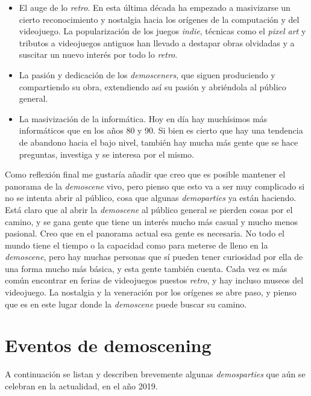 \begin{itemize}
	\item El auge de lo \emph{retro}. En esta última década ha empezado a masivizarse un cierto reconocimiento y nostalgia hacia los orígenes de la computación y del videojuego. La popularización de los juegos \emph{indie}, técnicas como el \emph{pixel art} y tributos a videojuegos antiguos han llevado a destapar obras olvidadas y a suscitar un nuevo interés por todo lo \emph{retro}.
	\item La pasión y dedicación de los \emph{demosceners}, que siguen produciendo y compartiendo su obra, extendiendo así su pasión y abriéndola al público general.
	\item La masivización de la informática. Hoy en día hay muchísimos más informáticos que en los años 80 y 90. Si bien es cierto que hay una tendencia de abandono hacia el bajo nivel, también hay mucha más gente que se hace preguntas, investiga y se interesa por el mismo.
\end{itemize}

Como reflexión final me gustaría añadir que creo que es posible mantener el panorama de la \emph{demoscene} vivo, pero pienso que esto va a ser muy complicado si no se intenta abrir al público, cosa que algunas \emph{demoparties} ya están haciendo. Está claro que al abrir la \emph{demoscene} al público general se pierden cosas por el camino, y se gana gente que tiene un interés mucho más casual y mucho menos pasional. Creo que en el panorama actual esa gente es necesaria. No todo el mundo tiene el tiempo o la capacidad como para meterse de lleno en la \emph{demoscene}, pero hay muchas personas que sí pueden tener curiosidad por ella de una forma mucho más básica, y esta gente también cuenta. Cada vez es más común encontrar en ferias de videojuegos puestos \emph{retro}, y hay incluso museos del videojuego. La nostalgia y la veneración por los orígenes se abre paso, y pienso que es en este lugar donde la \emph{demoscene} puede buscar su camino.

\section{Eventos de demoscening}

A continuación se listan y describen brevemente algunas \emph{demosparties} que aún se celebran en la actualidad, en el año 2019.

